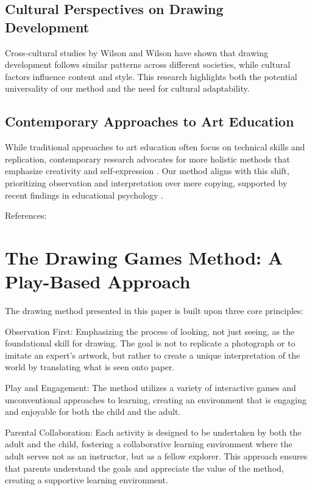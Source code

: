 \documentclass{article}
\begin{document}
\subsection{Cultural Perspectives on Drawing Development}

Cross-cultural studies by Wilson and Wilson \cite{13wilson1982teaching} have shown that drawing development follows similar patterns across different societies, while cultural factors influence content and style. This research highlights both the potential universality of our method and the need for cultural adaptability.

\subsection{Contemporary Approaches to Art Education}

While traditional approaches to art education often focus on technical skills and replication, contemporary research advocates for more holistic methods that emphasize creativity and self-expression \cite{14sheridan2022studio}. Our method aligns with this shift, prioritizing observation and interpretation over mere copying, supported by recent findings in educational psychology \cite{15gardner1990art}.

References:

\section{The Drawing Games Method: A Play-Based Approach}
\label{sec:others}

The drawing method presented in this paper is built upon three core principles:

Observation First: Emphasizing the process of looking, not just seeing, as the foundational skill for drawing. The goal is not to replicate a photograph or to imitate an expert’s artwork, but rather to create a unique interpretation of the world by translating what is seen onto paper.

Play and Engagement: The method utilizes a variety of interactive games and unconventional approaches to learning, creating an environment that is engaging and enjoyable for both the child and the adult.

Parental Collaboration: Each activity is designed to be undertaken by both the adult and the child, fostering a collaborative learning environment where the adult serves not as an instructor, but as a fellow explorer. This approach ensures that parents understand the goals and appreciate the value of the method, creating a supportive learning environment.
\end{document}
